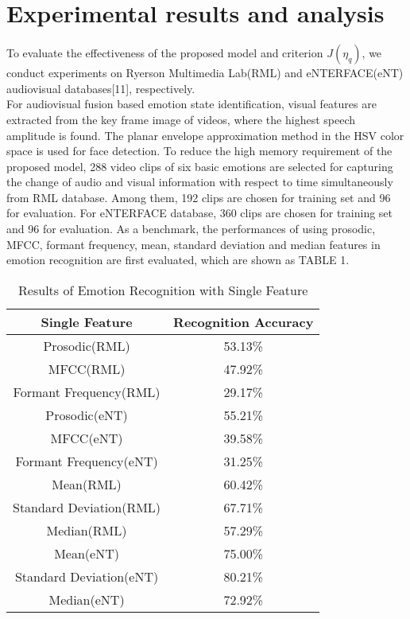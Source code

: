 \documentclass[10pt,journal,compsoc]{IEEEtran}
\begin{document}
\section{Experimental results and analysis}
To evaluate the effectiveness of the proposed model and criterion $J(\eta_q)$, we conduct experiments on Ryerson Multimedia Lab(RML) and eNTERFACE(eNT) audiovisual databases[11], respectively.\\\indent For audiovisual fusion based emotion state identification, visual features are extracted from the key frame image of videos, where the highest speech amplitude is found. The planar envelope approximation method in the HSV color space is used for face detection. To reduce the high memory requirement of the proposed model, 288 video clips of six basic emotions are selected for capturing the change of audio and visual information with respect to time simultaneously from RML database. Among them, 192 clips are chosen for training set and 96 for evaluation. For eNTERFACE database, 360 clips are chosen for training set and 96 for evaluation. As a benchmark, the performances of using prosodic, MFCC, formant frequency, mean, standard deviation and median features in emotion recognition are first evaluated, which are shown as TABLE 1.
\begin{table}[h]
\footnotesize
\renewcommand{\arraystretch}{1.5}
\caption{\normalsize{Results of Emotion Recognition with Single Feature}}
\setlength{\abovecaptionskip}{0pt}
\setlength{\belowcaptionskip}{10pt}
\centering
\tabcolsep 0.073in
\begin{tabular}{cc}
\hline
Single Feature & Recognition Accuracy\\
\hline
Prosodic(RML) &53.13\%\\
MFCC(RML) &47.92\%\\
Formant Frequency(RML) &29.17\%\\
Prosodic(eNT) &55.21\%\\
MFCC(eNT) &39.58\%\\
Formant Frequency(eNT) &31.25\%\\
Mean(RML) &60.42\%\\
Standard Deviation(RML) &67.71\%\\
Median(RML) &57.29\%\\
Mean(eNT) &75.00\%\\
Standard Deviation(eNT) &80.21\%\\
Median(eNT) &72.92\%\\
\hline
\end{tabular}
\end{table}\\
\end{document}
